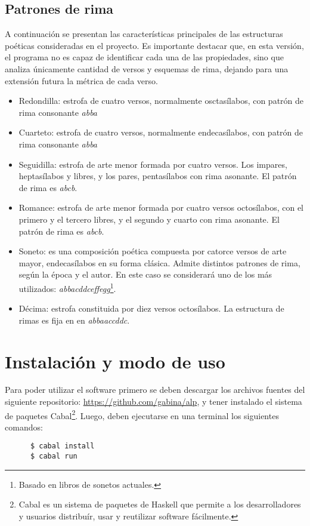 \documentclass[12pt, a4paper]{article}
\begin{document}
\subsection*{Patrones de rima}
A continuación se presentan las características principales de las estructuras poéticas consideradas en el proyecto. Es importante destacar que, en esta versión, el programa no es capaz de identificar cada una de las propiedades, sino que analiza únicamente cantidad de versos y esquemas de rima, dejando para una extensión futura la métrica de cada verso.
\begin{itemize}
	\item Redondilla: estrofa de cuatro versos, normalmente osctasílabos, con patrón de rima consonante \textit{abba}
	\item Cuarteto: estrofa de cuatro versos, normalmente endecasílabos, con patrón de rima consonante \textit{abba}
	\item Seguidilla: estrofa de arte menor formada por cuatro versos. Los impares, heptasílabos y libres, y los pares, pentasílabos con rima asonante. El patrón de rima es \textit{abcb}.
	\item Romance: estrofa de arte menor formada por cuatro versos octosílabos, con el primero y el tercero libres, y el segundo y cuarto con rima asonante. El patrón de rima es \textit{abcb}.
	\item Soneto: es una composición poética compuesta por catorce versos de arte mayor, endecasílabos en su forma clásica. Admite distintos patrones de rima, según la época y el autor. En este caso se considerará uno de los más utilizados: \textit{abbacddceffegg}\footnote{Basado en libros de sonetos actuales.}.
	\item Décima:  estrofa constituida por diez versos octosílabos. La estructura de rimas es fija en en \textit{abbaaccddc}. 

\end{itemize}

\section*{Instalación y modo de uso}
Para poder utilizar el software primero se deben descargar los archivos fuentes del siguiente repositorio: \url{https://github.com/gabina/alp}, y tener instalado el sistema de paquetes Cabal\footnote{Cabal es un sistema de paquetes de Haskell que permite a los desarrolladores y usuarios distribuír, usar y reutilizar software fácilmente.}. Luego, deben ejecutarse en una terminal los siguientes comandos:
\begin{verbatim}
      $ cabal install
      $ cabal run
\end{verbatim}
\end{document}
